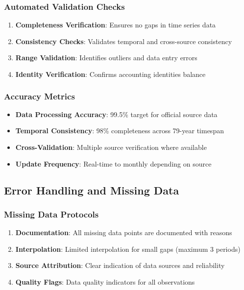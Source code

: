 \documentclass[11pt,a4paper]{article}
\begin{document}
\subsubsection{Automated Validation Checks}
\begin{enumerate}
    \item \textbf{Completeness Verification}: Ensures no gaps in time series data
    \item \textbf{Consistency Checks}: Validates temporal and cross-source consistency
    \item \textbf{Range Validation}: Identifies outliers and data entry errors
    \item \textbf{Identity Verification}: Confirms accounting identities balance
\end{enumerate}

\subsubsection{Accuracy Metrics}
\begin{itemize}
    \item \textbf{Data Processing Accuracy}: 99.5\% target for official source data
    \item \textbf{Temporal Consistency}: 98\% completeness across 79-year timespan
    \item \textbf{Cross-Validation}: Multiple source verification where available
    \item \textbf{Update Frequency}: Real-time to monthly depending on source
\end{itemize}

\subsection{Error Handling and Missing Data}

\subsubsection{Missing Data Protocols}
\begin{enumerate}
    \item \textbf{Documentation}: All missing data points are documented with reasons
    \item \textbf{Interpolation}: Limited interpolation for small gaps (maximum 3 periods)
    \item \textbf{Source Attribution}: Clear indication of data sources and reliability
    \item \textbf{Quality Flags}: Data quality indicators for all observations
\end{enumerate}
\end{document}
